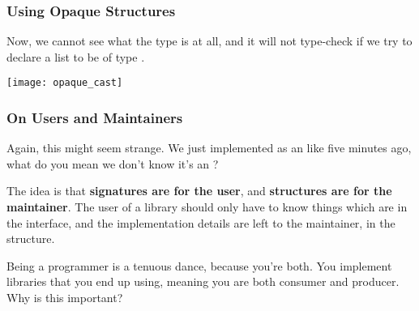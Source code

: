 \documentclass[aspectratio=169, handout]{beamer}
\begin{document}
\begin{frame}[fragile]
  \frametitle{Using Opaque Structures}

  Now, we cannot see what the type  is at all, and it will
  not type-check if we try to declare a list to be of type
  .

  \pause
  \vspace{\fill}

  \begin{center}
    \texttt{[image: opaque\_cast]}
  \end{center}
\end{frame}


\begin{frame}[fragile]
  \frametitle{On Users and Maintainers}

  Again, this might seem strange. We just implemented  as an
   like five minutes ago, what do you mean we don't know it's an
  ?

  \pause
  \vspace{\fill}

  The idea is that \textbf{signatures are for the user}, and \textbf{structures
  are for the maintainer}. The user of a library should only have to know things
  which are in the interface, and the implementation details are left to the
  maintainer, in the structure.

  \pause
  \vspace{\fill}

  Being a programmer is a tenuous dance, because you're both. You implement libraries
  that you end up using, meaning you are both consumer and producer. Why is this
  important?
\end{frame}
\end{document}
